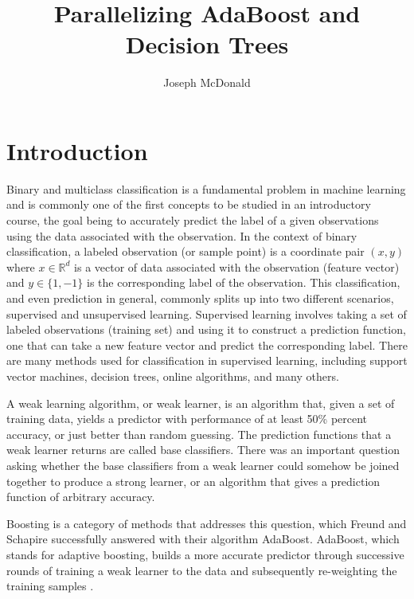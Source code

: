 \documentclass[12pt]{article}
\author{Joseph McDonald}
\title{Parallelizing AdaBoost and Decision Trees}
\begin{document}
\maketitle

\section{Introduction}
Binary and multiclass classification is a fundamental problem in machine
learning and is commonly one of the first concepts to be studied in an
introductory course, the goal being to accurately predict the label of a given
observations using the data associated with the observation. In the context of
binary classification, a labeled observation (or sample point) is a coordinate
pair $(x, y)$ where $x\in\mathbb{R}^d$ is a vector of data associated with the
observation (feature vector) and $y\in\{1, -1\}$ is the corresponding label of
the observation. This classification, and even prediction in general, commonly
splits up into two different scenarios, supervised and unsupervised learning.
Supervised learning involves taking a set of labeled observations (training
set) and using it to construct a prediction function, one that can take a new
feature vector and predict the corresponding label. There are many methods used
for classification in supervised learning, including support vector machines,
decision trees, online algorithms, and many others.

A weak learning algorithm, or weak learner, is an algorithm that, given a set of training data, yields a predictor with performance of at least 50\% percent accuracy, or just better than random guessing. The prediction functions that a weak learner returns are called base classifiers. There was an important question asking whether the base classifiers from a weak learner could somehow be joined together to produce a strong learner, or an algorithm that gives a prediction function of arbitrary accuracy.

Boosting is a category of methods that addresses this question, which Freund and Schapire
successfully answered with their algorithm AdaBoost. AdaBoost, which stands for adaptive boosting, builds
a more accurate predictor through successive rounds of training a weak learner
to the data and subsequently re-weighting the training samples \cite{no1}. 




\end{document}
